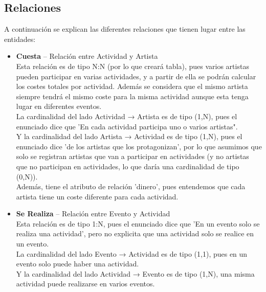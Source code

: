 \documentclass[12pt]{article}
\begin{document}
    \newpage
    \subsection{Relaciones}
    A continuación se explican las diferentes relaciones que tienen lugar entre las entidades:

    \begin{itemize}

        \item \textbf{Cuesta} -- Relación entre Actividad y Artista\\
            Esta relación es de tipo N:N (por lo que creará tabla), pues varios artistas pueden participar en varias actividades, y a partir de ella se 
            podrán calcular los costes totales por actividad. Además se considera que el mismo artista siempre tendrá el mismo coste para la misma actividad 
            aunque esta tenga lugar en diferentes eventos. \\
            La cardinalidad del lado Actividad → Artista es de tipo (1,N), pues el enunciado dice que 'En cada actividad participa uno o varios artistas". \\
            Y la cardinalidad del lado Artista → Actividad es de tipo (1,N), pues el enunciado dice 'de los artistas que los protagonizan', por lo que asumimos
            que solo se registran artistas que van a participar en actividades (y no artistas que no participan en actividades, lo que daría una cardinalidad
            de tipo (0,N)). \\
            Además, tiene el atributo de relación 'dinero', pues entendemos que cada artista tiene un coste diferente para cada actividad.
        
        \item \textbf{Se Realiza} -- Relación entre Evento y Actividad\\
            Esta relación es de tipo 1:N, pues el enunciado dice que 'En un evento solo se realiza una actividad', pero no explicita que una actividad solo se 
            realice en un evento. \\
            La cardinalidad del lado Evento → Actividad es de tipo (1,1), pues en un evento solo puede haber una actividad. \\
            Y la cardinalidad del lado Actividad → Evento es de tipo (1,N), una misma actividad puede realizarse en varios eventos.


\end{itemize}
\end{document}
